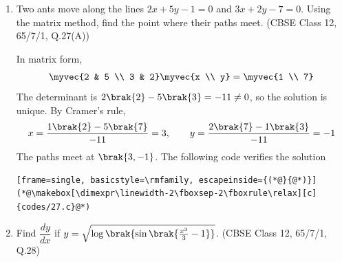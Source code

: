 \begin{enumerate}[label=\thesubsection.\arabic*, ref=\thesubsection.\theenumi]
\solution
Each block is equally likely, so the pmf is $\pr{X=x} = \frac{\text{number of blocks marked } x}{10}$:
\begin{table}[H]
	\centering
	\begin{tabular}{|c|c|c|c|c|}
		\hline
		$x$ & $0$ & $1$ & $2$ & $3$ \\ \hline
		$\pr{X=x}$ & $\frac{2}{10}$ & $\frac{3}{10}$ & $\frac{4}{10}$ & $\frac{1}{10}$ \\ \hline
	\end{tabular}
	\caption{Probability mass function of $X$}
	\label{tab:CBSE12-q25}
\end{table}
The probabilities sum to $1$. The mean is
\begin{align}
	E\sbrak{X} = \sum_x x\,\pr{X=x} = 0\brak{\frac{2}{10}} + 1\brak{\frac{3}{10}} + 2\brak{\frac{4}{10}} + 3\brak{\frac{1}{10}} = \frac{14}{10} = 1.4
\end{align}
The following code verifies the solution
\begin{lstlisting}[frame=single, basicstyle=\rmfamily, escapeinside={(*@}{@*)}]
(*@\makebox[\dimexpr\linewidth-2\fboxsep-2\fboxrule\relax][c]{codes/25.c}@*)
\end{lstlisting}

\item
Two ants move along the lines $2x + 5y - 1 = 0$ and $3x + 2y - 7 = 0$. Using the matrix method, find the point where their paths meet.
\hfill (CBSE Class 12, 65/7/1, Q.27(A))

\solution
In matrix form,
\begin{align}
	\myvec{2 & 5 \\ 3 & 2}\myvec{x \\ y} = \myvec{1 \\ 7}
\end{align}
The determinant is $2\brak{2} - 5\brak{3} = -11 \neq 0$, so the solution is unique. By Cramer's rule,
\begin{align}
	x = \frac{1\brak{2} - 5\brak{7}}{-11} = 3, \qquad y = \frac{2\brak{7} - 1\brak{3}}{-11} = -1
\end{align}
The paths meet at $\brak{3,-1}$.
The following code verifies the solution
\begin{lstlisting}[frame=single, basicstyle=\rmfamily, escapeinside={(*@}{@*)}]
(*@\makebox[\dimexpr\linewidth-2\fboxsep-2\fboxrule\relax][c]{codes/27.c}@*)
\end{lstlisting}

\item
Find $\dfrac{dy}{dx}$ if $y = \sqrt{\log\brak{\sin\brak{\frac{x^3}{3} - 1}}}$.
\hfill (CBSE Class 12, 65/7/1, Q.28)


\end{enumerate}
